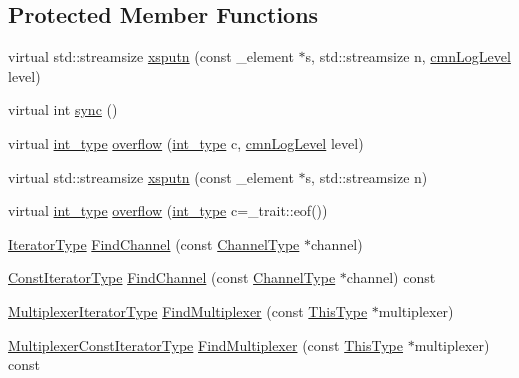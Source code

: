 \subsection*{Protected Member Functions}
\begin{DoxyCompactItemize}
\item 
virtual std\-::streamsize \hyperlink{classcmn_l_o_d_multiplexer_streambuf_afd0e34593a849612cfdbb09f56d5376d}{xsputn} (const \-\_\-element $\ast$s, std\-::streamsize n, \hyperlink{cmn_log_lo_d_8h_a70c67165c37a0971e0dd1a85d4edaaae}{cmn\-Log\-Level} level)
\item 
virtual int \hyperlink{classcmn_l_o_d_multiplexer_streambuf_aa51aeb57da7090f3243b5b43c888ac9d}{sync} ()
\item 
virtual \hyperlink{classcmn_l_o_d_multiplexer_streambuf_a8d1eadc5cf72b594aa2c2fef6401fe47}{int\-\_\-type} \hyperlink{classcmn_l_o_d_multiplexer_streambuf_a95173de27f7abc67614838d79858c5bf}{overflow} (\hyperlink{classcmn_l_o_d_multiplexer_streambuf_a8d1eadc5cf72b594aa2c2fef6401fe47}{int\-\_\-type} c, \hyperlink{cmn_log_lo_d_8h_a70c67165c37a0971e0dd1a85d4edaaae}{cmn\-Log\-Level} level)
\item 
virtual std\-::streamsize \hyperlink{classcmn_l_o_d_multiplexer_streambuf_a143dfb4f86ab7f7b5e29bde48fae4bba}{xsputn} (const \-\_\-element $\ast$s, std\-::streamsize n)
\item 
virtual \hyperlink{classcmn_l_o_d_multiplexer_streambuf_a8d1eadc5cf72b594aa2c2fef6401fe47}{int\-\_\-type} \hyperlink{classcmn_l_o_d_multiplexer_streambuf_a9c6ee8fe5130932c795ab9f6ba707edd}{overflow} (\hyperlink{classcmn_l_o_d_multiplexer_streambuf_a8d1eadc5cf72b594aa2c2fef6401fe47}{int\-\_\-type} c=\-\_\-trait\-::eof())
\item 
\hyperlink{classcmn_l_o_d_multiplexer_streambuf_a32236d21fe0e9a13f4bea6ed743b0613}{Iterator\-Type} \hyperlink{classcmn_l_o_d_multiplexer_streambuf_a43509761f3e077378365b9071852eaf1}{Find\-Channel} (const \hyperlink{classcmn_l_o_d_multiplexer_streambuf_aa3b0347701c1aa5157a719978a1a6386}{Channel\-Type} $\ast$channel)
\item 
\hyperlink{classcmn_l_o_d_multiplexer_streambuf_ad60c91a0708ddcaf266d48f09d37bb63}{Const\-Iterator\-Type} \hyperlink{classcmn_l_o_d_multiplexer_streambuf_a3ed5f2e5714a17240ae469439da531a4}{Find\-Channel} (const \hyperlink{classcmn_l_o_d_multiplexer_streambuf_aa3b0347701c1aa5157a719978a1a6386}{Channel\-Type} $\ast$channel) const 
\item 
\hyperlink{classcmn_l_o_d_multiplexer_streambuf_addfaa1fedcd4e3b6df8e4020ec2cbde3}{Multiplexer\-Iterator\-Type} \hyperlink{classcmn_l_o_d_multiplexer_streambuf_a9af046b700b5984bb6df20dfe107e046}{Find\-Multiplexer} (const \hyperlink{classcmn_l_o_d_multiplexer_streambuf_aa50efd43cb53bb6be746e3990e02452a}{This\-Type} $\ast$multiplexer)
\item 
\hyperlink{classcmn_l_o_d_multiplexer_streambuf_a8c5b7460b364a24c760c4acaa6d6f042}{Multiplexer\-Const\-Iterator\-Type} \hyperlink{classcmn_l_o_d_multiplexer_streambuf_ab8c6ea404b8da54ee18f7972e640b46e}{Find\-Multiplexer} (const \hyperlink{classcmn_l_o_d_multiplexer_streambuf_aa50efd43cb53bb6be746e3990e02452a}{This\-Type} $\ast$multiplexer) const 
\end{DoxyCompactItemize}

